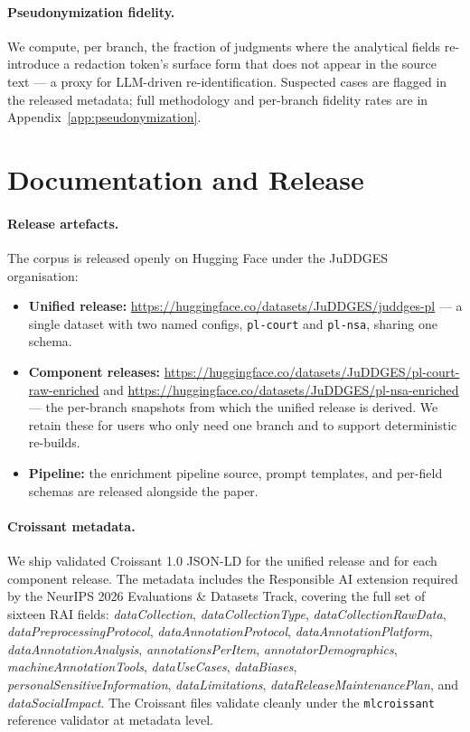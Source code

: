 \documentclass{article}
\begin{document}
\paragraph{Pseudonymization fidelity.} We compute, per branch, the fraction of judgments where the analytical fields re-introduce a redaction token's surface form that does not appear in the source text --- a proxy for LLM-driven re-identification. Suspected cases are flagged in the released metadata; full methodology and per-branch fidelity rates are in Appendix~\ref{app:pseudonymization}.

\section{Documentation and Release}
\label{sec:documentation}

\paragraph{Release artefacts.} The corpus is released openly on Hugging Face under the JuDDGES organisation:
\begin{itemize}
    \item \textbf{Unified release:} \url{https://huggingface.co/datasets/JuDDGES/juddges-pl} --- a single dataset with two named configs, \texttt{pl-court} and \texttt{pl-nsa}, sharing one schema.
    \item \textbf{Component releases:} \url{https://huggingface.co/datasets/JuDDGES/pl-court-raw-enriched} and \url{https://huggingface.co/datasets/JuDDGES/pl-nsa-enriched} --- the per-branch snapshots from which the unified release is derived. We retain these for users who only need one branch and to support deterministic re-builds.
    \item \textbf{Pipeline:} the enrichment pipeline source, prompt templates, and per-field schemas are released alongside the paper.
\end{itemize}

\paragraph{Croissant metadata.} We ship validated Croissant 1.0 JSON-LD for the unified release and for each component release. The metadata includes the Responsible AI extension required by the NeurIPS 2026 Evaluations \& Datasets Track, covering the full set of sixteen RAI fields: \emph{dataCollection}, \emph{dataCollectionType}, \emph{dataCollectionRawData}, \emph{dataPreprocessingProtocol}, \emph{dataAnnotationProtocol}, \emph{dataAnnotationPlatform}, \emph{dataAnnotationAnalysis}, \emph{annotationsPerItem}, \emph{annotatorDemographics}, \emph{machineAnnotationTools}, \emph{dataUseCases}, \emph{dataBiases}, \emph{personalSensitiveInformation}, \emph{dataLimitations}, \emph{dataReleaseMaintenancePlan}, and \emph{dataSocialImpact}. The Croissant files validate cleanly under the \texttt{mlcroissant} reference validator at metadata level.
\end{document}
